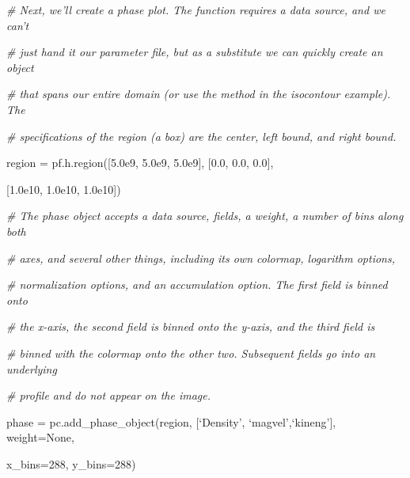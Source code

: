 {\it\# Next, we'll create a phase plot. The function requires a data source, and we can't}
{\setlength{\parskip}{0pt}

{\it\# just hand it our parameter file, but as a substitute we can quickly create an object}

{\it\# that spans our entire domain (or use the method in the isocontour example). The}

{\it\#  specifications of the region (a box) are the center, left bound, and right bound.}

region = pf.h.region([5.0e9, 5.0e9, 5.0e9], [0.0, 0.0, 0.0],
}

{\setlength{\parindent}{100pt}[1.0e10, 1.0e10, 1.0e10])}

{\it\# The phase object accepts a data source, fields, a weight, a number of bins along both}
{\setlength{\parskip}{0pt}

{\it\# axes, and several other things, including its own colormap, logarithm options,}

{\it\# normalization options, and an accumulation option. The first field is binned onto}

{\it\# the x-axis, the second field is binned onto the y-axis, and the third field is}

{\it\# binned with the colormap onto the other two. Subsequent fields go into an underlying}

{\it\# profile and do not appear on the image.}

phase = pc.add\_phase\_object(region, [`Density', `magvel',`kineng'], weight=None,
}

{\setlength{\parindent}{143pt}x\_bins=288, y\_bins=288)}

